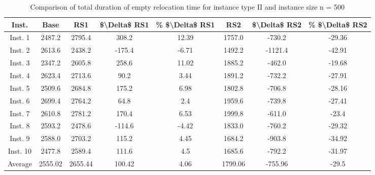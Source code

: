 \begin{table}[H]
\centering
\begin{tabular}{cccccccc}
  \hline
  \textbf{Inst.} & \textbf{Base} & \textbf{RS1} & \textbf{\$\textbackslash{}Delta\$  RS1} & \textbf{\% \$\textbackslash{}Delta\$  RS1} & \textbf{RS2} & \textbf{\$\textbackslash{}Delta\$  RS2} & \textbf{\% \$\textbackslash{}Delta\$  RS2} \\\hline
  Inst. 1 & 2487.2 & 2795.4 & 308.2 & 12.39 & 1757.0 & -730.2 & -29.36 \\
  Inst. 2 & 2613.6 & 2438.2 & -175.4 & -6.71 & 1492.2 & -1121.4 & -42.91 \\
  Inst. 3 & 2347.2 & 2605.8 & 258.6 & 11.02 & 1885.2 & -462.0 & -19.68 \\
  Inst. 4 & 2623.4 & 2713.6 & 90.2 & 3.44 & 1891.2 & -732.2 & -27.91 \\
  Inst. 5 & 2509.6 & 2684.8 & 175.2 & 6.98 & 1802.8 & -706.8 & -28.16 \\
  Inst. 6 & 2699.4 & 2764.2 & 64.8 & 2.4 & 1959.6 & -739.8 & -27.41 \\
  Inst. 7 & 2610.8 & 2781.2 & 170.4 & 6.53 & 1999.8 & -611.0 & -23.4 \\
  Inst. 8 & 2593.2 & 2478.6 & -114.6 & -4.42 & 1833.0 & -760.2 & -29.32 \\
  Inst. 9 & 2588.0 & 2703.2 & 115.2 & 4.45 & 1684.2 & -903.8 & -34.92 \\
  Inst. 10 & 2477.8 & 2589.4 & 111.6 & 4.5 & 1685.6 & -792.2 & -31.97 \\
  Average & 2555.02 & 2655.44 & 100.42 & 4.06 & 1799.06 & -755.96 & -29.5 \\\hline
\end{tabular}
\caption{Comparison of total duration of empty relocation time for instance type II and instance size n = 500}
\label{tab:wait:resrelocation-empty-relocation-comparison_II_500}
\end{table}
